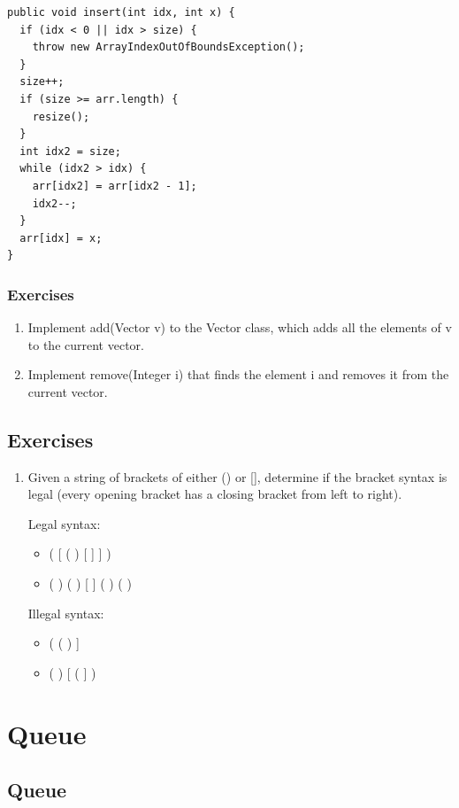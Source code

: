 \documentclass[11pt,oneside]{book}
\begin{document}
\begin{lstlisting}
public void insert(int idx, int x) {
  if (idx < 0 || idx > size) {
    throw new ArrayIndexOutOfBoundsException();
  }
  size++;
  if (size >= arr.length) {
    resize();
  }
  int idx2 = size;
  while (idx2 > idx) {
    arr[idx2] = arr[idx2 - 1];
    idx2--;
  }
  arr[idx] = x;
}
\end{lstlisting}

\subsection{Exercises}

\begin{enumerate}
\item Implement add(Vector v) to the Vector class, which adds all the elements of v to the current vector.
\item Implement remove(Integer i) that finds the element i and removes it from the current vector.
\end{enumerate}

        \section{ Exercises }
        

\begin{enumerate}
\item Given a string of brackets of either () or [], determine if the bracket syntax is legal (every opening bracket has a closing bracket from left to right).

Legal syntax:

\begin{itemize}
\item ( [ ( ) [ ] ] )
\item ( ) ( ) [ ] ( ) ( )
\end{itemize}

Illegal syntax:

\begin{itemize}
\item ( ( ) ]
\item ( ) [ ( ] )
\end{itemize}
\end{enumerate}

    \chapter{ Queue }
        \section{ Queue }
        
\end{document}

